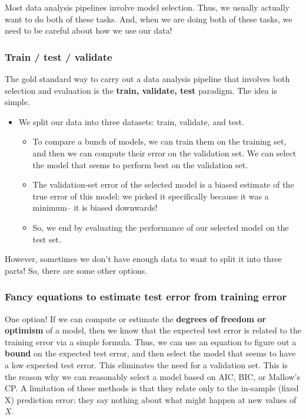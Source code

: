 Most data analysis pipelines involve model selection. Thus, we usually actually want to do both of these tasks. And, when we are doing both of these tasks, we need to be careful about how we use our data! 

\subsubsection{Train / test / validate}

The gold standard way to carry out a data analysis pipeline that involves both selection and evaluation is the \textbf{train, validate, test} paradigm. The idea is simple. 
\begin{itemize}
\item We split our data into three datasets: train, validate, and test. 
\begin{itemize}
\item To compare a bunch of models, we can train them on the training set, and then we can compute their error on the validation set. We can select the model that seems to perform best on the validation set. 
\item The validation-set error of the selected model is a biased estimate of the true error of this model: we picked it specifically because it was a minimum-- it is biased downwards! 
\item So, we end by evaluating the performance of our selected model on the test set.
\end{itemize}	
\end{itemize}

However, sometimes we don't have enough data to want to split it into three parts! So, there are some other options.

\subsubsection{Fancy equations to estimate test error from training error}

One option! If we can compute or estimate the \textbf{degrees of freedom or optimism} of a model, then we know that the expected test error is related to the training error via a simple formula. Thus, we can use an equation to figure out a \textbf{bound} on the expected test error, and then select the model that seems to have a low expected test error. This eliminates the need for a validation set. This is the reason why we can reasonably select a model based on AIC, BIC, or Mallow's CP. A limitation of these methods is that they relate only to the in-sample (fixed X) prediction error: they say nothing about what might happen at new values of $X$. 

